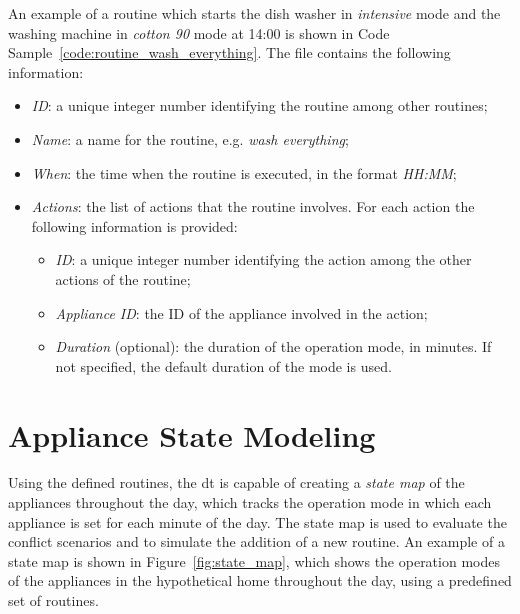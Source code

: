 An example of a routine which starts the dish washer in \textit{intensive} mode and the washing machine in \textit{cotton 90} mode at 14:00 is shown in Code Sample~\ref{code:routine_wash_everything}. The file contains the following information:
\begin{itemize}
    \item \textit{ID}: a unique integer number identifying the routine among other routines;
    \item \textit{Name}: a name for the routine, e.g. \textit{wash everything};
    \item \textit{When}: the time when the routine is executed, in the format \textit{HH:MM};
    \item \textit{Actions}: the list of actions that the routine involves. For each action the following information is provided:
        \begin{itemize}
            \item \textit{ID}: a unique integer number identifying the action among the other actions of the routine;
            \item \textit{Appliance ID}: the ID of the appliance involved in the action;
            \item \textit{Duration} (optional): the duration of the operation mode, in minutes. If not specified, the default duration of the mode is used.
        \end{itemize}
\end{itemize}



\section{Appliance State Modeling}

Using the defined routines, the \acrshort{dt} is capable of creating a \textit{state map} of the appliances throughout the day, which tracks the operation mode in which each appliance is set for each minute of the day. The state map is used to evaluate the conflict scenarios and to simulate the addition of a new routine. An example of a state map is shown in Figure~\ref{fig:state_map}, which shows the operation modes of the appliances in the hypothetical home throughout the day, using a predefined set of routines.

